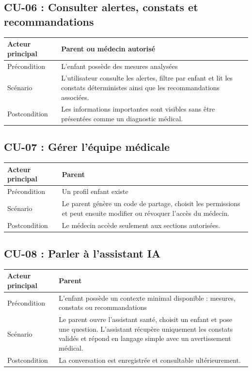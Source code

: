 \subsection{CU-06 : Consulter alertes, constats et recommandations}
\begin{tabularx}{\textwidth}{|l|X|}
\hline
Acteur principal & Parent ou médecin autorisé \\
\hline
Précondition & L'enfant possède des mesures analysées \\
\hline
Scénario & L'utilisateur consulte les alertes, filtre par enfant et lit les constats déterministes ainsi que les recommandations associées. \\
\hline
Postcondition & Les informations importantes sont visibles sans être présentées comme un diagnostic médical. \\
\hline
\end{tabularx}

\subsection{CU-07 : Gérer l'équipe médicale}
\begin{tabularx}{\textwidth}{|l|X|}
\hline
Acteur principal & Parent \\
\hline
Précondition & Un profil enfant existe \\
\hline
Scénario & Le parent génère un code de partage, choisit les permissions et peut ensuite modifier ou révoquer l'accès du médecin. \\
\hline
Postcondition & Le médecin accède seulement aux sections autorisées. \\
\hline
\end{tabularx}

\subsection{CU-08 : Parler à l'assistant IA}
\begin{tabularx}{\textwidth}{|l|X|}
\hline
Acteur principal & Parent \\
\hline
Précondition & L'enfant possède un contexte minimal disponible : mesures, constats ou recommandations \\
\hline
Scénario & Le parent ouvre l'assistant santé, choisit un enfant et pose une question. L'assistant récupère uniquement les constats validés et répond en langage simple avec un avertissement médical. \\
\hline
Postcondition & La conversation est enregistrée et consultable ultérieurement. \\
\hline
\end{tabularx}

